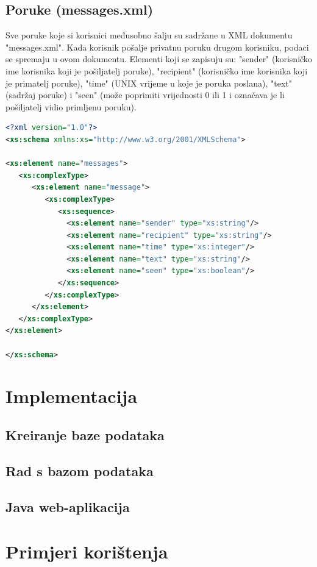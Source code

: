 \documentclass{foi}
\begin{document}
\section{Poruke (messages.xml)}

Sve poruke koje si korisnici međusobno šalju su sadržane u XML dokumentu "messages.xml". Kada korisnik pošalje privatnu poruku drugom korisniku, podaci se spremaju u ovom dokumentu. Elementi koji se zapisuju su: "sender" (korisničko ime korisnika koji je pošiljatelj poruke), "recipient" (korisničko ime korisnika koji je primatelj poruke), "time" (UNIX vrijeme u koje je poruka poslana), "text" (sadržaj poruke) i "seen" (može poprimiti vrijednosti 0 ili 1 i označava je li pošiljatelj vidio primljenu poruku).

\begin{lstlisting}[language=XML]
 <?xml version="1.0"?>
<xs:schema xmlns:xs="http://www.w3.org/2001/XMLSchema">

<xs:element name="messages">
   <xs:complexType>
      <xs:element name="message">
         <xs:complexType>
            <xs:sequence>
              <xs:element name="sender" type="xs:string"/>
              <xs:element name="recipient" type="xs:string"/>
              <xs:element name="time" type="xs:integer"/>
              <xs:element name="text" type="xs:string"/>
              <xs:element name="seen" type="xs:boolean"/>
            </xs:sequence>
         </xs:complexType>
      </xs:element>
   </xs:complexType>
</xs:element>

</xs:schema> 
\end{lstlisting}

\chapter{Implementacija}

\section{Kreiranje baze podataka}
\section{Rad s bazom podataka}
\section{Java web-aplikacija}

\chapter{Primjeri korištenja}
\end{document}
